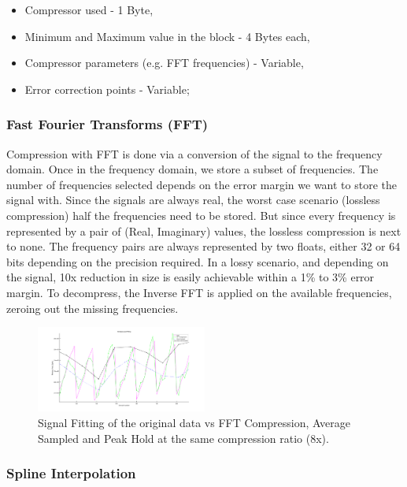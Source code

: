 \documentclass[conference]{IEEEtran}
\begin{document}
\begin{itemize}
    \item Compressor used - 1 Byte,
    \item Minimum and Maximum value in the block - 4 Bytes each,
    \item Compressor parameters (e.g. FFT frequencies) - Variable,
    \item Error correction points - Variable;
\end{itemize}
\vspace{5pt}

\subsubsection{Fast Fourier Transforms (FFT)}

Compression with FFT is done via a conversion of the signal to the frequency domain. Once in the frequency domain, we store a subset of frequencies.
The number of frequencies selected depends on the error margin we want to store the signal with. Since the signals are always real, the worst case scenario (lossless compression) half the frequencies need to be stored.
But since every frequency is represented by a pair of (Real, Imaginary) values, the lossless compression is next to none. 
The frequency pairs are always represented by two floats, either 32 or 64 bits depending on the precision required.
In a lossy scenario, and depending on the signal, 10x reduction in size is easily achievable within a 1\% to 3\% error margin.
To decompress, the Inverse FFT is applied on the available frequencies, zeroing out the missing frequencies.

\begin{figure}[ht]
  \centering
  \includegraphics[width=0.5\textwidth]{fftvsaverages-2.png}
  \caption{Signal Fitting of the original data vs FFT Compression, Average Sampled and Peak Hold at the same compression ratio (8x).}
  \label{fft_comparison}
\end{figure}

\subsubsection{Spline Interpolation}
\end{document}
